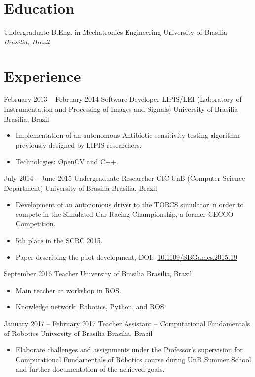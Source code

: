 \documentclass[a4paper, 10pt, roman]{moderncv}        %
\begin{document}
\makecvtitle
\section{Education}
\cventry
{Undergraduate}
{B.Eng. in Mechatronics Engineering}
{University of Brasilia}
{}
{\textit{Brasilia, Brazil}}
{}
\section{Experience}
\cventry
{February 2013 -- February 2014}
{Software Developer}
{LIPIS/LEI (Laboratory of Instrumentation and Processing of Images and Signals)}
{University of Brasilia}
{Brasilia, Brazil}
{\begin{itemize}%
    \item Implementation of an autonomous Antibiotic sensitivity testing algorithm previously designed by LIPIS researchers.
    \item Technologies: OpenCV and C++.
    \end{itemize}}
\cventry
{July 2014 -- June 2015}
{Undergraduate Researcher}
{CIC UnB (Computer Science Department)}
{University of Brasilia}
{Brasilia, Brazil}
{\begin{itemize}%
    \item Development of an \href{https://github.com/bruno147/driver-ga}{autonomous driver} to the TORCS simulator in order to compete in the Simulated Car Racing Championship, a former GECCO Competition.
    \item 5th place in the SCRC 2015.
    \item Paper describing the pilot development, DOI:~\href{https://doi.org/10.1109/SBGames.2015.19}{10.1109/SBGames.2015.19}
    \end{itemize}}
\cventry
{September 2016}
{Teacher}
{University of Brasilia}
{}
{Brasilia, Brazil}
{\begin{itemize}%
    \item Main teacher at workshop in ROS.
    \item Knowledge network: Robotics, Python, and ROS.
    \end{itemize}}
\cventry
{January 2017 -- February 2017}
{Teacher Assistant -- Computational Fundamentals of Robotics}
{University of Brasilia}
{}
{Brasilia, Brazil}
{\begin{itemize}%
    \item Elaborate challenges and assignments under the Professor's supervision for Computational Fundamentals of Robotics course during UnB Summer School and further documentation of the achieved goals.
    \end{itemize}}
\end{document}
